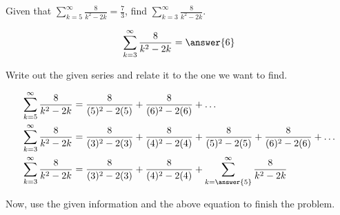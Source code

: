 \documentclass{ximera}
\author{Jim Talamo}
\begin{document}
\begin{exercise}
Given that $\sum_{k=5}^{\infty} \frac{8}{k^2-2k} = \frac{7}{3}$, find $\sum_{k=3}^{\infty} \frac{8}{k^2-2k}$.

\[
\sum_{k=3}^{\infty}\frac{8}{k^2-2k} = \answer{6}
\]

\begin{hint}
Write out the given series and relate it to the one we want to find.

\begin{align*}
\sum_{k=5}^{\infty}\frac{8}{k^2-2k}&=\frac{8}{(5)^2-2(5)} + \frac{8}{(6)^2-2(6)} + \ldots \\
\sum_{k=3}^{\infty}\frac{8}{k^2-2k}&= \frac{8}{(3)^2-2(3)} +\frac{8}{(4)^2-2(4)}+\frac{8}{(5)^2-2(5)}+\frac{8}{(6)^2-2(6)}+  \ldots \\
\sum_{k=3}^{\infty}\frac{8}{k^2-2k}&= \frac{8}{(3)^2-2(3)} +\frac{8}{(4)^2-2(4)}+\sum_{k=\answer{5}}^{\infty}\frac{8}{k^2-2k}
\end{align*}
  
Now, use the given information and the above equation to finish the problem.
 \end{hint}

\end{exercise}
\end{document}
